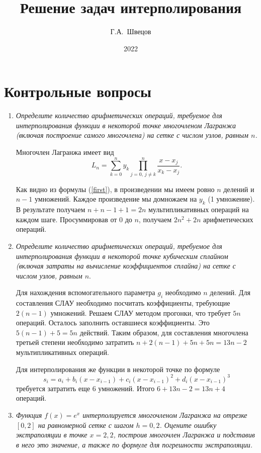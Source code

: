 \documentclass[12pt, a4paper]{article}
\title{Решение задач интерполирования}
\author{Г.А.~Швецов}
\date{2022}
\begin{document}
	\newcommand{\pl}{\partial}
	\maketitle
	
	\tableofcontents
	
	\newpage
	
	\section{Контрольные вопросы}
	\begin{enumerate}
		\item \textit{Определите количество арифметических операций, требуемое для интерполирования функции в некоторой точке
			многочленом Лагранжа (включая построение самого многочлена) на сетке с числом узлов, равным $n$.}
		\smallskip
		
		Многочлен Лагранжа имеет вид
		\begin{equation}
			L_n = \sum_{k = 0}^n y_k \prod_{j=0,\,j \ne k}^n \frac{x - x_j}{x_k - x_j}. 
			\label{first}
		\end{equation}
		
		
		Как видно из формулы (\ref{first}), в произведении мы имеем ровно $n$ делений и $n-1$ умножений. Каждое произведение мы домножаем на $y_k$ (1 умножение). В результате получаем $n+n-1+1=2n$ мультипликативных операций на каждом шаге. Просуммировав от $0$ до $n$, получаем $2n^2+2n$ арифметических операций. 
		\smallskip
		\item \textit{Определите количество арифметических операций, требуемое для интерполирования функции в некоторой точке
			кубическим сплайном (включая затраты на вычисление коэффициентов сплайна) на сетке с числом узлов, равным $n$}.
		\smallskip
		
		Для нахождения вспомогательного параметра $g_i$ необходимо $n$ делений. Для составления СЛАУ необходимо посчитать коэффициенты, требующие $2(n-1)$ умножений. Решаем СЛАУ методом прогонки, что требует $5n$ операций. Осталось заполнить оставшиеся коэффициенты. Это $5(n-1)+5=5n$ действий. Таким образом, для составления многочлена третьей степени необходимо затратить $n+2(n-1)+5n+5n=13n-2$ мультипликативных операций.
		
		Для интерполирования же функции в некоторой точке по формуле
		\begin{equation}
			s_i=a_i+b_i(x-x_{i-1})+c_i(x-x_{i-1})^2+d_i(x-x_{i-1})^3
			\label{second}
		\end{equation}
		требуется затратить еще 6 умножений. Итого $6+13n-2=13n+4$ операций.
		\smallskip
		\item \textit{Функция $f(x) = e^{x}$ интерполируется многочленом Лагранжа на отрезке $[0, 2]$ на равномерной сетке с шагом $h = 0,2$.
			Оцените ошибку экстраполяции в точке $x = 2{,}2$, построив многочлен Лагранжа и подставив в него это значение, а также по формуле для погрешности экстраполяции.}
		\smallskip
		

\end{enumerate}
\end{document}
